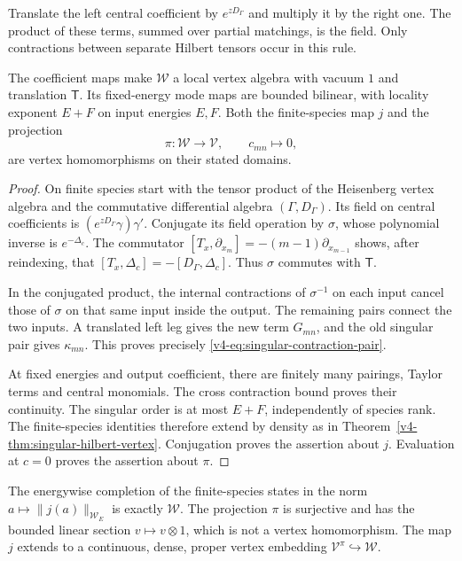 Translate the left central coefficient by
\(e^{zD_\Gamma}\) and multiply it by the
right one. The product of these terms,
summed over partial matchings, is the field.
Only contractions between separate Hilbert
tensors occur in this rule.

\begin{proposition}\label{v4-prop:singular-contraction-vertex}
The coefficient maps make \(\mathcal W\) a
local vertex algebra with vacuum \(1\) and
translation \(\mathsf T\). Its fixed-energy
mode maps are bounded bilinear, with locality
exponent \(E+F\) on input energies \(E,F\).
Both the finite-species map \(j\) and the
projection
\[
                  \pi:\mathcal W\longrightarrow\mathcal V,
                  \qquad c_{mn}\longmapsto0,
\]
are vertex homomorphisms on their stated domains.
\end{proposition}

\begin{proof}
On finite species start with the tensor product
of the Heisenberg vertex algebra and the
commutative differential algebra
\((\Gamma,D_\Gamma)\). Its field on central
coefficients is \((e^{zD_\Gamma}\gamma)\gamma'\).
Conjugate its field operation by \(\sigma\),
whose polynomial inverse is \(e^{-\Delta_c}\).
The commutator
\([T_x,\partial_{x_m}]=-(m-1)\partial_{x_{m-1}}\)
shows, after reindexing, that
\([T_x,\Delta_c]=-[D_\Gamma,\Delta_c]\).
Thus \(\sigma\) commutes with \(\mathsf T\).

In the conjugated product, the internal
contractions of \(\sigma^{-1}\) on each input
cancel those of \(\sigma\) on that same
input inside the output. The remaining
pairs connect the two inputs. A translated
left leg gives the new term \(G_{mn}\),
and the old singular pair gives
\(\kappa_{mn}\). This proves precisely
\eqref{v4-eq:singular-contraction-pair}.

At fixed energies and output coefficient,
there are finitely many pairings, Taylor
terms and central monomials. The cross
contraction bound proves their continuity.
The singular order is at most \(E+F\),
independently of species rank. The
finite-species identities therefore extend
by density as in
Theorem~\ref{v4-thm:singular-hilbert-vertex}.
Conjugation proves the assertion about \(j\).
Evaluation at \(c=0\) proves the assertion
about \(\pi\).
\end{proof}

\begin{theorem}\label{v4-thm:singular-contraction-completion}
The energywise completion of the finite-species
states in the norm
\(a\mapsto\|j(a)\|_{\mathcal W_E}\) is
exactly \(\mathcal W\).
The projection \(\pi\) is surjective and
has the bounded linear section \(v\mapsto v\otimes1\),
which is not a vertex homomorphism.
The map \(j\) extends to a continuous,
dense, proper vertex embedding
\(\mathcal V^\pi\hookrightarrow\mathcal W\).
\end{theorem}

